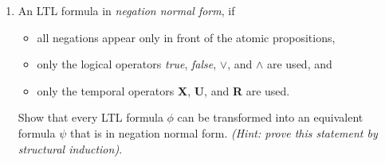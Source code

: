 \begin{enumerate}
\begin{center}
\end{center}

\item

An LTL formula in \emph{negation normal form}, if
\begin{itemize}
\item all negations appear only in front of the atomic propositions,
\item only the logical operators \emph{true}, \emph{false}, $\vee$, and $\wedge$ are used, and
\item only the temporal operators \textbf{X}, \textbf{U}, and \textbf{R} are used.
\end{itemize}

Show that every LTL formula $\phi$ can be transformed into an equivalent formula $\psi$ that is in negation normal form.
\emph{(Hint: prove this statement by structural induction)}.

\end{enumerate}